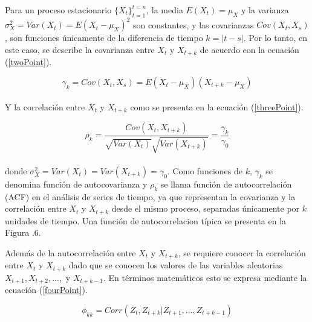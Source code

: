 Para un proceso estacionario $\{X_{t}\}^{t=n}_{t=1}$, la media $E(X_{t}) = \mu_{X}$ y la varianza $\sigma^{2}_{X} = Var(X_{t}) = E(X_{t}-\mu_{X})^2 $ son constantes, y las covarianzas $Cov(X_{t},X_{s})$, son funciones
únicamente de la diferencia de tiempo $k=|t-s|$. Por lo tanto, en este caso, se describe la covarianza
entre $X_{t}$ y $X_{t+k}$ de acuerdo con la ecuación (\ref{twoPoint}).

\begin{equation}
\gamma_{k} = Cov(X_{t},X_{s}) =  E(X_{t}-\mu_{X})(X_{t+k}-\mu_{X})
\label{twoPoint}
\end{equation}
\\

Y la correlación entre $X_{t}$ y $X_{t+k}$ como se presenta en la ecuación (\ref{threePoint}).

\begin{equation}
\rho_{k} = \frac{Cov(X_{t},X_{t+k})}{\sqrt{Var(X_{t})} \sqrt{Var(X_{t+k})}} = \frac{\gamma_{k}}{\gamma_{0}}
\label{threePoint}
\end{equation}
\\

donde $\sigma^{2}_{X} = Var(X_{t}) = Var(X_{t+k}) = \gamma_{0}$. Como funciones de $k$, $\gamma_{k}$ se denomina función de autocovarianza y $\rho_{k}$ se llama función de autocorrelación (ACF) en el análisis de series de tiempo, ya que representan la covarianza y la correlación entre $X_t$ y $X_{t+k}$ desde el mismo proceso, separadas únicamente por $k$ unidades de tiempo. Una función de autocorrelacion típica se presenta en la Figura .6.

Además de la autocorrelación entre $X_t$ y $X_{t+k}$, se requiere conocer la correlación entre $X_t$ y $X_{t+k}$ dado que se conocen los valores de las variables aleatorias $X_{t+1},X_{t+2},...,$ y $X_{t+k-1}$. En términos
matemáticos esto se expresa mediante la ecuación (\ref{fourPoint}).

\begin{equation}
\phi_{kk} = Corr(Z_t,Z_{t+k}|Z_{t+1},...,Z_{t+k-1})
\label{fourPoint}
\end{equation}
\\


